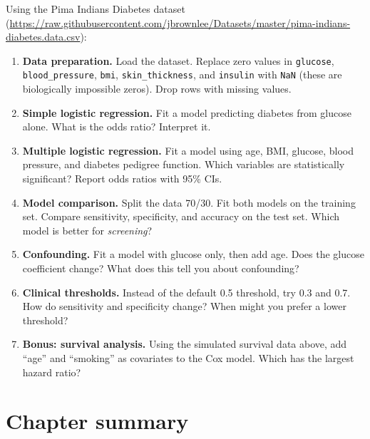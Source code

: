 \begin{exercise}
Using the Pima Indians Diabetes dataset (\url{https://raw.githubusercontent.com/jbrownlee/Datasets/master/pima-indians-diabetes.data.csv}):
\begin{enumerate}
  \item \textbf{Data preparation.} Load the dataset. Replace zero values in \texttt{glucose}, \texttt{blood\_pressure}, \texttt{bmi}, \texttt{skin\_thickness}, and \texttt{insulin} with \texttt{NaN} (these are biologically impossible zeros). Drop rows with missing values.
  \item \textbf{Simple logistic regression.} Fit a model predicting diabetes from glucose alone. What is the odds ratio? Interpret it.
  \item \textbf{Multiple logistic regression.} Fit a model using age, BMI, glucose, blood pressure, and diabetes pedigree function. Which variables are statistically significant? Report odds ratios with 95\% CIs.
  \item \textbf{Model comparison.} Split the data 70/30. Fit both models on the training set. Compare sensitivity, specificity, and accuracy on the test set. Which model is better for \emph{screening}?
  \item \textbf{Confounding.} Fit a model with glucose only, then add age. Does the glucose coefficient change? What does this tell you about confounding?
  \item \textbf{Clinical thresholds.} Instead of the default 0.5 threshold, try 0.3 and 0.7. How do sensitivity and specificity change? When might you prefer a lower threshold?
  \item \textbf{Bonus: survival analysis.} Using the simulated survival data above, add ``age'' and ``smoking'' as covariates to the Cox model. Which has the largest hazard ratio?
\end{enumerate}
\end{exercise}

\section{Chapter summary}

